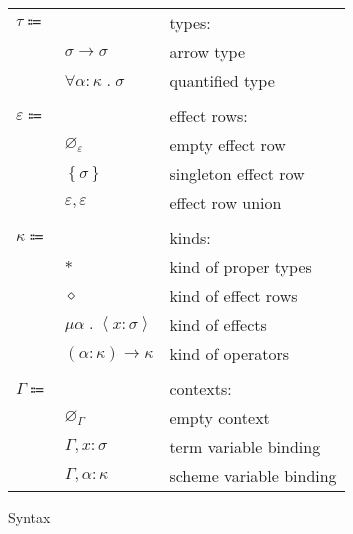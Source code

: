 \documentclass[12pt]{article}
\newcommand\anno[2]{#1 : #2} %
\newcommand\parens[1]{\left( #1 \right)} %
\newcommand\evar{x}
\newcommand\scheme{\sigma}
\newcommand\svar{\alpha}
\newcommand\type{\tau}
\newcommand\tarrow[2]{#1 \rightarrow #2} %
\newcommand\ttforall[2]{\forall #1 \; . \; #2} %
\newcommand\row{\varepsilon}
\newcommand\rempty{\varnothing_{\row}}
\newcommand\rsingleton[1]{\left\{ #1 \right\}}
\newcommand\runion[2]{#1, #2}
\newcommand\kind{\kappa}
\newcommand\ktype{\ast}
\newcommand\krow{\diamond} %
\newcommand\keffect[3]{\mu #1 \; . \; \left\langle\anno{#2}{#3}\right\rangle} %
\newcommand\karrow[2]{\parens{#1} \rightarrow #2} %
\newcommand\context{\Gamma}
\newcommand\cempty{\varnothing_{\context}}
\newcommand\ceextend[2]{#1, #2}
\newcommand\csextend[2]{#1, #2}
\begin{document}
\begin{figure}
\begin{mdframed}[backgroundcolor=none]
\begin{center}
\begin{tabular}{l l l}
          $\type \Coloneqq$ & & types: \\
          & $\tarrow{\scheme}{\scheme}$ & arrow type \\
          & $\ttforall{\anno{\svar}{\kind}}{\scheme}$ & quantified type \\
          \\
          $\row \Coloneqq$ & & effect rows: \\
          & $\rempty$ & empty effect row \\
          & $\rsingleton{\scheme}$ & singleton effect row \\
          & $\runion{\row}{\row}$ & effect row union \\
          \\
          $\kind \Coloneqq $ & & kinds: \\
          & $\ktype$ & kind of proper types \\
          & $\krow$ & kind of effect rows \\
          & $\keffect{\svar}{\evar}{\scheme}$ & kind of effects \\
          & $\karrow{\anno{\svar}{\kind}}{\kind}$ & kind of operators \\
          \\
          $\context \Coloneqq$ & & contexts: \\
          & $\cempty$ & empty context \\
          & $\ceextend{\context}{\anno{\evar}{\scheme}}$ & term variable binding \\
          & $\csextend{\context}{\anno{\svar}{\kind}}$ & scheme variable binding \\
        \end{tabular}
      \end{center}

      \caption{Syntax}\label{fig:syntax}
    \end{mdframed}
  \end{figure}
\end{document}
